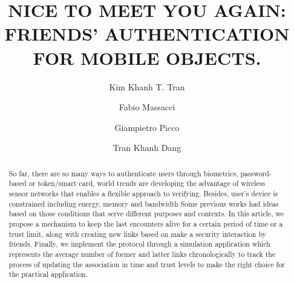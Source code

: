 \documentclass[sigconf]{acmart}
\begin{document}
\title{NICE TO MEET YOU AGAIN: FRIENDS' AUTHENTICATION FOR MOBILE OBJECTS.}

\author{Kim Khanh T. Tran}

\author{Fabio Massacci}

\author{Giampietro Picco}

\author{Tran Khanh Dang}

\renewcommand{\shortauthors}{TKK Tran, F. Massacci, GP. Picco, TK Dang}


\begin{abstract}
So far, there are so many ways to authenticate users through biometrics, password-based or token/smart card, world trends are developing the advantage of wireless sensor networks that enables a flexible approach to verifying. Besides, user's device is constrained including energy, memory and bandwidth Some previous works had ideas based on those conditions that serve different purposes and contexts. In this article, we propose a mechanism to keep the last encounters alive for a certain period of time or a trust limit, along with creating new links based on make a security interaction by friends. Finally, we implement the protocol through a simulation application which represents the average number of former and latter links chronologically to track the process of updating the association in time and trust levels to make the right choice for the practical application.
\end{abstract}
\end{document}
